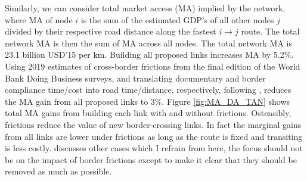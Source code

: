 \documentclass[a4paper]{article}
\begin{document}
Similarly, we can consider total market access (MA) implied by the network, where MA of node $i$ is the sum of the estimated GDP's of all other nodes $j$ divided by their respective road distance along the fastest $i\to j$ route. The total network MA is then the sum of MA across all nodes. The total network MA is 23.1 billion USD'15 per km. Building all proposed links increases MA by 5.2\%. Using 2019 estimates of cross-border frictions from the final edition of the World Bank Doing Business surveys, and translating documentary and border compliance time/cost into road time/distance, respectively, following \citet{krantz2024optimal}, reduces the MA gain from all proposed links to 3\%. Figure \ref{fig:MA_DA_TAN} shows total MA gains from building each link with and without frictions. Ostensibly, frictions reduce the value of new border-crossing links. In fact the marginal gains from all links are lower under frictions as long as the route is fixed and transiting is less costly.  \citet{krantz2024optimal} discusses other cases which I refrain from here, the focus should not be on the impact of border frictions except to make it clear that they should be removed as much as possible. 
\end{document}
